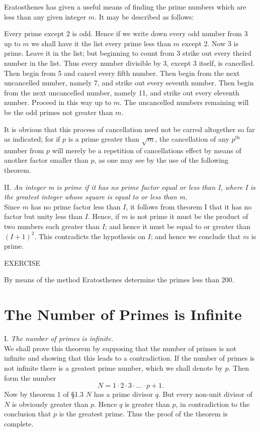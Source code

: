 \documentclass[oneside,12pt]{book}
\begin{document}
Eratosthenes has given a useful means of finding the prime numbers which are less than any given integer $m$. It may be described as follows: \par 

Every prime except 2 is odd. Hence if we write down every odd number from 3 up to $m$ we shall have it the list every prime less than $m$ except 2. Now 3 is prime. Leave it in the list; but beginning to count from 3 strike out every theird number in the list. Thus every number divisible by 3, except 3 itself, is cancelled. Then begin from 5 and cancel every fifth number. Then begin from the next uncancelled number, namely 7, and strike out every seventh number. Then begin from the next uncancelled number, namely 11, and strike out every eleventh number. Proceed in this way up to $m$. The uncancelled numbers remaining will be the odd primes not greater than $m$. \par 

It is obvious that this process of cancellation need not be carred altogether so far as indicated; for if $p$ is a prime greater than $\sqrt{m}$, the cancellation of any $p^{\text{th}}$ number from $p$ will merely be a repetition of cancellations effect by means of another factor smaller than $p$, as one may see by the use of the following theorem. \par 

II. \textit{An integer m is prime if it has no prime factor equal or less than I, where I is the greatest integer whose square is equal to or less than m.}\\ 
\indent Since $m$ has no prime factor less than $I$, it follows from theorem I that it has no factor but unity less than $I$. Hence, if $m$ is not prime it must be the product of two numbers each greater than $I$; and hence it must be equal to or greater than$(I+1)^2$. This contradicts the hypothesis on $I$; and hence we conclude that $m$ is prime. \par 

\begin{center}
    \uppercase{Exercise}
\end{center}
By means of the method Eratosthenes determine the primes less than 200. \par 

\section{The Number of Primes is Infinite}
I. \textit{The number of primes is infinite.}\\
\indent We shall prove this theorem by supposing that the number of primes is not infinite and showing that this leads to a contradiction. If the number of primes is not infinite there is a greatest prime number, which we shall denote by $p$. Then form the number 
$$N=1\cdot 2\cdot 3\cdot \dots \cdot p +1.$$
Now by theorem 1 of \S 1.3 $N$ has a prime divisor $q$. But every non-unit divisor of $N$ is obviously greater than $p$. Hence $q$ is greater than $p$, in contradiction to the conclusion that $p$ is the greatest prime. Thus the proof of the theorem is complete. \par 
\end{document}
